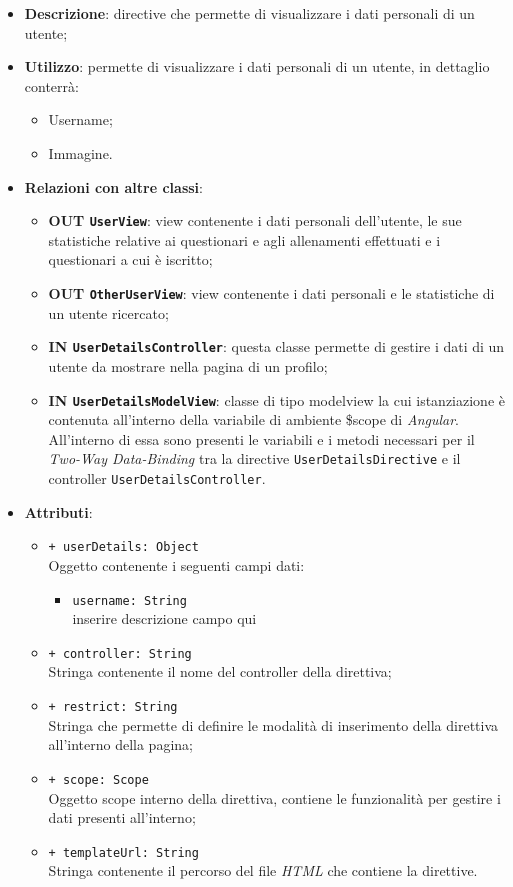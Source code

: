 \begin{itemize}
	\item \textbf{Descrizione}: directive che permette di visualizzare i dati personali di un utente;
	\item \textbf{Utilizzo}: permette di visualizzare i dati personali di un utente, in dettaglio conterrà:
	\begin{itemize}
		\item Username;
		\item Immagine.
	\end{itemize}
	\item \textbf{Relazioni con altre classi}:
	\begin{itemize}
		\item \textbf{OUT \texttt{UserView}}: view contenente i dati personali dell'utente, le sue statistiche relative ai questionari e agli allenamenti effettuati e i questionari a cui è iscritto;
		\item \textbf{OUT \texttt{OtherUserView}}: view contenente i dati personali e le statistiche di un utente ricercato;
		\item \textbf{IN \texttt{UserDetailsController}}: questa classe permette di gestire i dati di un utente da mostrare nella pagina di un profilo;
		\item \textbf{IN \texttt{UserDetailsModelView}}: classe di tipo modelview la cui istanziazione è contenuta all'interno della variabile di ambiente \$scope di \textit{Angular}. All'interno di essa sono presenti le variabili e i metodi necessari per il \textit{Two-Way Data-Binding} tra la directive \texttt{UserDetailsDirective} e il controller \texttt{UserDetailsController}.
	\end{itemize}
	\item \textbf{Attributi}:
	\begin{itemize}
		\item \texttt{+ userDetails: Object} \\ Oggetto contenente i seguenti campi dati:
		\begin{itemize}
			\item \texttt{username: String} \\
			inserire descrizione campo qui
		\end{itemize}
		\item \texttt{+ controller: String} \\ Stringa contenente il nome del controller della direttiva;
		\item \texttt{+ restrict: String} \\ Stringa che permette di definire le modalità di inserimento della direttiva all'interno della pagina;
		\item \texttt{+ scope: Scope} \\ Oggetto scope interno della direttiva, contiene le funzionalità per gestire i dati presenti all'interno;
		\item \texttt{+ templateUrl: String} \\ Stringa contenente il percorso del file \textit{HTML} che contiene la direttive.
	\end{itemize}
\end{itemize}